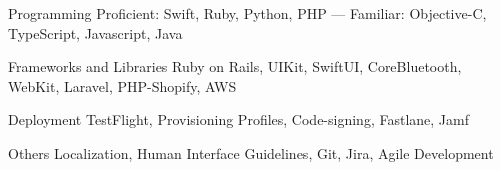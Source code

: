 

\begin{cvskills}

  \cvskill
    {Programming} %
    {Proficient: Swift, Ruby, Python, PHP  --- Familiar: Objective-C, TypeScript, Javascript, Java} %

  \cvskill
    {Frameworks and Libraries} %
    {Ruby on Rails, UIKit, SwiftUI, CoreBluetooth, WebKit, Laravel, PHP-Shopify, AWS} %
    
  \cvskill
    {Deployment} %
    {TestFlight, Provisioning Profiles, Code-signing, Fastlane, Jamf} %

  \cvskill
    {Others} %
    {Localization, Human Interface Guidelines, Git, Jira, Agile Development} %

\end{cvskills}